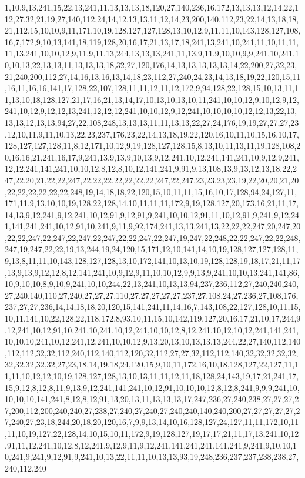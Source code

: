 1,10,9,13,241,15,22,13,241,11,13,13,13,18,120,27,140,236,16,172,13,13,13,12,14,22,112,27,32,21,19,27,140,112,24,14,12,13,13,11,12,14,23,200,140,112,23,22,14,13,18,18,21,112,15,10,10,9,11,171,10,19,128,127,127,128,13,10,12,9,11,11,10,143,128,127,108,16,7,172,9,10,13,141,18,119,128,20,16,17,21,13,17,18,241,13,241,10,241,11,10,11,11,11,13,241,10,10,12,9,11,9,11,13,244,13,13,13,241,11,13,9,11,9,10,10,9,9,241,10,241,10,10,13,22,13,13,11,13,13,13,18,32,27,120,176,14,13,13,13,13,13,14,22,200,27,32,23,21,240,200,112,27,14,16,13,16,13,14,18,23,112,27,240,24,23,14,13,18,19,22,120,15,11,16,11,16,16,141,17,128,22,107,128,11,11,12,11,12,172,9,94,128,22,128,15,10,13,11,11,13,10,18,128,127,21,17,16,21,13,14,17,10,13,10,13,10,11,241,10,10,12,9,10,12,9,12,241,10,12,9,12,12,13,241,12,12,12,241,10,10,12,9,12,241,10,10,10,10,12,12,13,22,13,13,13,12,13,13,94,27,22,108,248,13,13,13,11,11,13,13,22,27,24,176,19,19,27,27,27,23,12,10,11,9,11,10,13,22,23,237,176,23,22,14,13,18,19,22,120,16,10,11,10,15,16,10,17,128,127,127,128,11,8,12,171,10,12,9,19,128,127,128,15,8,13,10,11,13,11,19,128,108,20,16,16,21,241,16,17,9,241,13,9,13,9,10,13,9,12,241,10,12,241,141,241,10,9,12,9,241,12,12,241,141,241,10,10,12,8,12,8,10,12,141,241,9,91,9,13,108,13,9,13,12,13,18,22,247,22,20,21,22,22,247,22,22,22,22,22,22,22,247,22,247,23,23,23,23,19,22,20,20,21,20,22,22,22,22,22,22,248,19,14,18,18,22,120,15,10,11,11,15,16,10,17,128,94,24,127,11,171,11,9,13,10,10,19,128,22,128,14,10,11,11,11,172,9,19,128,127,20,173,16,21,11,17,14,13,9,12,241,9,12,241,10,12,91,9,12,91,9,241,10,10,12,91,11,10,12,91,9,241,9,12,241,141,241,241,10,12,91,10,241,9,11,9,92,174,241,13,13,241,13,22,22,22,247,20,247,20,22,22,247,22,247,22,247,22,247,22,22,247,22,247,19,247,22,248,22,22,247,22,22,248,247,19,247,22,22,19,13,244,19,24,120,15,171,12,10,141,14,10,19,128,127,127,128,11,9,13,8,11,11,10,143,128,127,128,13,10,172,141,10,13,10,19,128,128,19,18,17,21,11,17,13,9,13,9,12,12,8,12,141,241,10,9,12,9,11,10,10,12,9,9,13,9,241,10,10,13,241,141,86,10,9,10,10,8,9,10,9,241,10,10,244,22,13,241,10,13,13,94,237,236,112,27,240,240,240,27,240,140,110,27,240,27,27,27,110,27,27,27,27,27,237,27,108,24,27,236,27,108,176,237,27,27,236,14,14,18,18,20,120,15,141,241,11,14,16,7,143,108,22,127,128,10,11,15,10,11,141,10,22,128,22,118,172,8,93,10,11,15,10,142,119,127,20,16,17,21,10,17,244,9,12,241,10,12,91,10,241,10,241,10,12,241,10,10,12,8,12,241,10,12,10,12,241,141,241,10,10,10,241,10,12,241,12,241,10,10,12,9,13,20,13,10,13,13,13,244,22,27,140,112,140,112,112,32,32,112,240,112,140,112,120,32,112,27,27,32,112,112,140,32,32,32,32,32,32,32,32,32,32,27,23,18,14,19,18,24,120,15,9,10,11,172,16,10,18,128,127,22,127,11,11,11,10,12,12,10,19,128,127,128,13,10,13,11,11,12,11,18,128,24,143,19,17,21,241,17,15,9,12,8,12,8,11,9,13,9,12,241,141,241,10,12,91,10,10,10,12,8,12,8,241,9,9,9,241,10,10,10,10,141,241,8,12,8,12,91,13,20,13,11,13,13,13,17,247,236,27,240,238,27,27,27,27,200,112,200,240,240,27,238,27,240,27,240,27,240,240,140,240,200,27,27,27,27,27,27,240,27,23,18,244,20,18,20,120,16,7,9,9,13,14,10,16,128,127,24,127,11,11,172,10,11,11,10,19,127,22,128,14,10,15,10,11,172,9,19,128,127,19,17,17,21,11,17,13,241,10,12,91,11,12,241,10,12,8,12,241,9,12,9,11,9,12,241,141,241,241,141,241,9,241,9,10,10,10,241,9,241,9,12,91,9,241,10,13,22,11,11,10,13,13,93,19,248,236,237,237,238,238,27,240,112,240